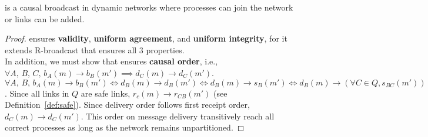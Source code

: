 \begin{lemma}
  \CBROADCAST is a causal broadcast in dynamic networks where processes can join
  the network or links can be added.
\end{lemma}

\begin{proof}
  \CBROADCAST ensures \textbf{validity}, \textbf{uniform agreement}, and \textbf{uniform integrity},
  for it extends R-broadcast that ensures all 3 properties. \\
  In addition, we must show that \CBROADCAST ensures \textbf{causal order},
  i.e., $\forall A,\,B,\,C,\, b_A(m) \rightarrow b_B(m')
  \implies d_C(m) \rightarrow d_C(m')$. \\
  $\forall A,\,B,\, b_A(m) \rightarrow b_B(m') \Leftrightarrow d_B(m) \rightarrow d_B(m') \Leftrightarrow
  d_B(m) \rightarrow s_B(m') \Leftrightarrow d_B(m) \rightarrow (\forall C\in Q, s_{BC}(m'))$. Since all links
  in $Q$ are safe links, $r_c(m) \rightarrow r_{CB}(m')$ (see Definition~\ref{def:safe}).
  Since delivery order follows first receipt order,
  $d_C(m) \rightarrow d_C(m')$. This order on message delivery transitively reach all correct processes
  as long as the network remains unpartitioned.
\end{proof}


